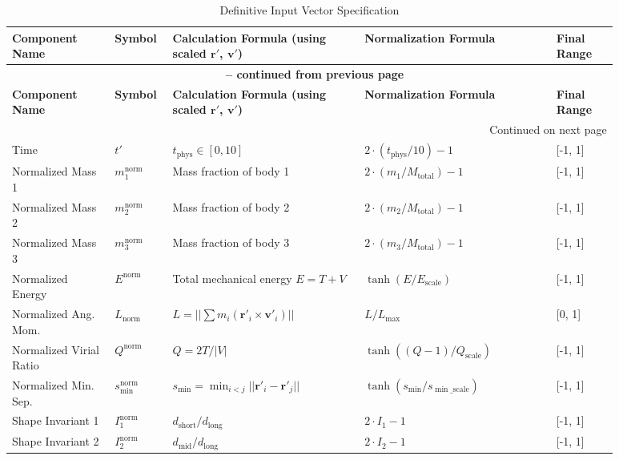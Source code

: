 \renewcommand{\arraystretch}{1.2}
\begin{longtable}{p{0.15\linewidth} p{0.06\linewidth} p{0.29\linewidth} p{0.29\linewidth} p{0.09\linewidth}}
\caption{Definitive Input Vector Specification} \label{tab:input_vector} \\
\toprule
\textbf{Component Name} & \textbf{Symbol} & \textbf{Calculation Formula (using scaled $\mathbf{r}'$, $\mathbf{v}'$)} & \textbf{Normalization Formula} & \textbf{Final Range} \\
\midrule
\endfirsthead
\multicolumn{5}{c}{{\bfseries \tablename\ \thetable{} -- continued from previous page}} \\
\toprule
\textbf{Component Name} & \textbf{Symbol} & \textbf{Calculation Formula (using scaled $\mathbf{r}'$, $\mathbf{v}'$)} & \textbf{Normalization Formula} & \textbf{Final Range} \\
\midrule
\endhead
\midrule \multicolumn{5}{r}{{Continued on next page}} \\ \bottomrule
\endfoot
\bottomrule
\endlastfoot
Time & $t'$ & $t_{\text{phys}} \in [0, 10]$ & $2 \cdot (t_{\text{phys}} / 10) - 1$ & [-1, 1] \\
Normalized Mass 1 & $m_1^{\text{norm}}$ & Mass fraction of body 1 & $2 \cdot (m_1 / M_{\text{total}}) - 1$ & [-1, 1] \\
Normalized Mass 2 & $m_2^{\text{norm}}$ & Mass fraction of body 2 & $2 \cdot (m_2 / M_{\text{total}}) - 1$ & [-1, 1] \\
Normalized Mass 3 & $m_3^{\text{norm}}$ & Mass fraction of body 3 & $2 \cdot (m_3 / M_{\text{total}}) - 1$ & [-1, 1] \\
Normalized Energy & $E^{\text{norm}}$ & Total mechanical energy $E=T+V$ & $\tanh(E/E_{\text{scale}})$ & [-1, 1] \\
Normalized Ang. Mom. & $L_{\text{norm}}$ & $L = ||\sum m_i (\mathbf{r}'_i \times \mathbf{v}'_i)||$ & $L / L_{\max}$ & [0, 1] \\
Normalized Virial Ratio & $Q^{\text{norm}}$ & $Q = 2T / |V|$ & $\tanh((Q - 1) / Q_{\text{scale}})$ & [-1, 1] \\
Normalized Min. Sep. & $s_{\min}^{\text{norm}}$ & $s_{\min} = \min_{i<j} ||\mathbf{r}'_i - \mathbf{r}'_j||$ & $\tanh(s_{\min} / s_{\min\_\text{scale}})$ & [-1, 1] \\
Shape Invariant 1 & $I_1^{\text{norm}}$ & $d_{\text{short}} / d_{\text{long}}$ & $2 \cdot I_1 - 1$ & [-1, 1] \\
Shape Invariant 2 & $I_2^{\text{norm}}$ & $d_{\text{mid}} / d_{\text{long}}$ & $2 \cdot I_2 - 1$ & [-1, 1] \\

\end{longtable}
